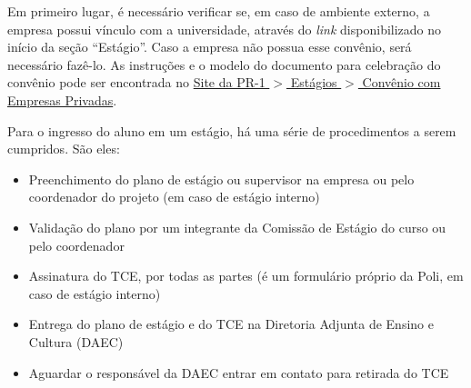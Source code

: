             
            Em primeiro lugar, é necessário verificar se, em caso de ambiente externo, a empresa possui vínculo com a universidade, através do \textit{link} disponibilizado no início da seção ``Estágio''. Caso a empresa não possua esse convênio, será necessário fazê-lo. As instruções e o modelo do documento para celebração do convênio pode ser encontrada no \href{https://xn--graduao-2wa9a.ufrj.br/images/stories/_pr1/pdf/estagio/Minuta---Convenio-Empresa-Privada-2017-_Prof-Eduardo_.pdf}{Site da PR-1 $>$ Estágios $>$ Convênio com Empresas Privadas}.
            
            Para o ingresso do aluno em um estágio, há uma série de procedimentos a serem cumpridos. São eles:
            
            \begin{itemize}
                \item Preenchimento do plano de estágio ou supervisor na empresa ou pelo coordenador do projeto (em caso de estágio interno)
                \item Validação do plano por um integrante da Comissão de Estágio do curso ou pelo coordenador
                \item Assinatura do TCE, por todas as partes (é um formulário próprio da Poli, em caso de estágio interno)
                \item Entrega do plano de estágio e do TCE na Diretoria Adjunta de Ensino e Cultura (DAEC)
                \item Aguardar o responsável da DAEC entrar em contato para retirada do TCE
            \end{itemize}
        
        
        
        